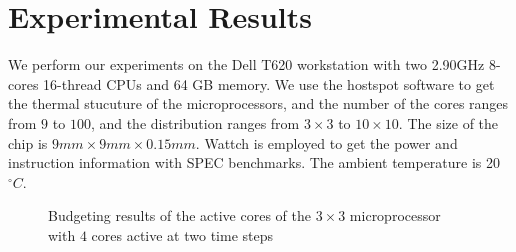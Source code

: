 \section{Experimental Results}
We perform our experiments on the Dell T620 workstation with two 2.90GHz 8-cores 16-thread CPUs and 64 GB memory. We use the hostspot \cite{Huang:TVLSI'06} software to get the thermal stucuture of the microprocessors, and the number of the cores ranges from $9$ to $100$, and the distribution ranges from $3\times 3$ to $10 \times 10$. The size of the chip is $9mm\times 9mm \times 0.15mm$. Wattch \cite{Brooks:ISCA'00} is employed to get the power and instruction information with SPEC \cite{Henning:IEEEC'00} benchmarks. The ambient temperature is 20 $^\circ C$.

\begin{figure}
\centering
\caption{Budgeting results of the active cores of the $3\times 3$ microprocessor with $4$ cores active at two time steps}\label{bud}
\end{figure}

